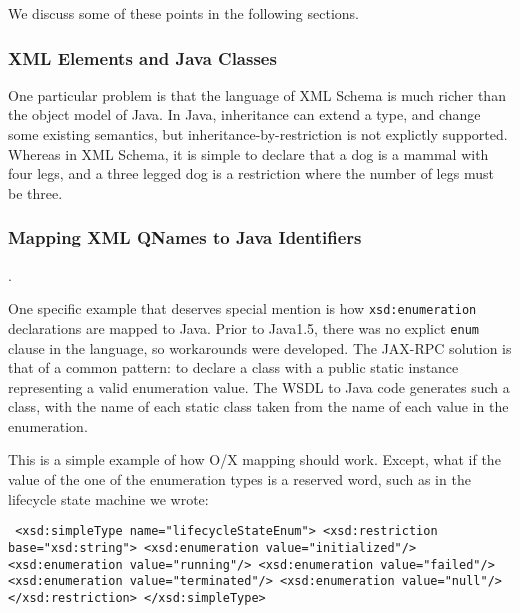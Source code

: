 We discuss some of these points in the following sections.

\subsubsection{XML Elements and Java Classes}
\label{objections:o-x:xml-classes}

One particular problem is that the language of XML Schema is much
richer than the object model of Java. In Java, inheritance can extend
a type, and change some existing semantics, but
inheritance-by-restriction is not explictly supported. Whereas in XML
Schema, it is simple to declare that a dog is a mammal with four legs,
and a three legged dog is a restriction where the number of legs must
be three.


\subsubsection{Mapping XML QNames to Java Identifiers}
\label{objections:o-x:names}

.

One specific example that deserves special mention is how
\verb$xsd:enumeration$ declarations are mapped to Java. Prior to
Java1.5, there was no explict \verb$enum$ clause in the language, so
workarounds were developed. The JAX-RPC solution is that of a common
pattern: to declare a class with a public static instance representing
a valid enumeration value. The WSDL to Java code generates such a
class, with the name of each static class taken from the name of each
value in the enumeration.

This is a simple example of how O/X mapping should work. Except, what if the
value of the one of the enumeration types is a reserved word, such as in the
lifecycle state machine we wrote:

{\tt
 <xsd:simpleType name="lifecycleStateEnum">
    <xsd:restriction base="xsd:string">
      <xsd:enumeration value="initialized"/>
      <xsd:enumeration value="running"/>
      <xsd:enumeration value="failed"/>
      <xsd:enumeration value="terminated"/>
      <xsd:enumeration value="null"/>
    </xsd:restriction>
  </xsd:simpleType>
}

